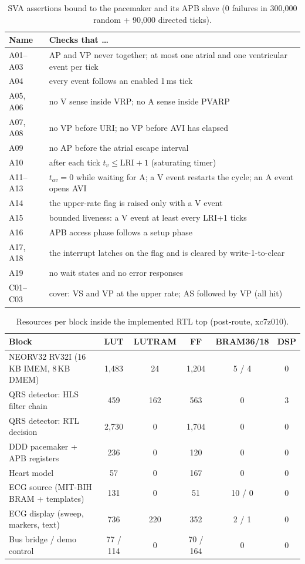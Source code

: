 \documentclass[11pt,a4paper]{article}
\begin{document}
\begin{table}[H]\centering\small
\caption{SVA assertions bound to the pacemaker and its APB slave (0 failures in 300{,}000 random + 90{,}000 directed ticks).}\label{tab:svalist}\label{app:sva}
\begin{tabularx}{\linewidth}{@{}lX@{}}
\toprule
Name & Checks that \ldots\\
\midrule
A01--A03 & AP and VP never together; at most one atrial and one ventricular event per tick\\
A04 & every event follows an enabled 1\,ms tick\\
A05, A06 & no V sense inside VRP; no A sense inside PVARP\\
A07, A08 & no VP before URI; no VP before AVI has elapsed\\
A09 & no AP before the atrial escape interval\\
A10 & after each tick $t_v \le \mathrm{LRI}+1$ (saturating timer)\\
A11--A13 & $t_{av}=0$ while waiting for A; a V event restarts the cycle; an A event opens AVI\\
A14 & the upper-rate flag is raised only with a V event\\
A15 & bounded liveness: a V event at least every LRI+1 ticks\\
A16 & APB access phase follows a setup phase\\
A17, A18 & the interrupt latches on the flag and is cleared by write-1-to-clear\\
A19 & no wait states and no error responses\\
C01--C03 & cover: VS and VP at the upper rate; AS followed by VP (all hit)\\
\bottomrule
\end{tabularx}
\end{table}

\begin{table}[H]\centering\small
\caption{Resources per block inside the implemented RTL top (post-route, xc7z010).}\label{tab:perblock}
\begin{tabular}{@{}lccccc@{}}
\toprule
Block & LUT & LUTRAM & FF & BRAM36/18 & DSP\\
\midrule
NEORV32 RV32I (16\,KB IMEM, 8\,KB DMEM) & 1{,}483 & 24 & 1{,}204 & 5 / 4 & 0\\
QRS detector: HLS filter chain & 459 & 162 & 563 & 0 & 3\\
QRS detector: RTL decision & 2{,}730 & 0 & 1{,}704 & 0 & 0\\
DDD pacemaker + APB registers & 236 & 0 & 120 & 0 & 0\\
Heart model & 57 & 0 & 167 & 0 & 0\\
ECG source (MIT-BIH BRAM + templates) & 131 & 0 & 51 & 10 / 0 & 0\\
ECG display (sweep, markers, text) & 736 & 220 & 352 & 2 / 1 & 0\\
Bus bridge / demo control & 77 / 114 & 0 & 70 / 164 & 0 & 0\\
\bottomrule
\end{tabular}
\end{table}
\end{document}
